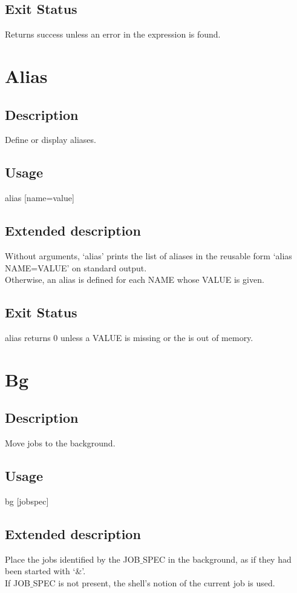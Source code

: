 \documentclass[12pt,a4paper]{report}
\begin{document}
\section{Exit Status}
Returns success unless an error in the expression is found.
\newpage

\chapter{Alias}
\section{Description}
Define or display aliases.
\section{Usage}
alias [name=value]
\section{Extended description}
Without arguments, `alias' prints the list of aliases in the reusable
form `alias NAME=VALUE' on standard output.\\

\noindent Otherwise, an alias is defined for each NAME whose VALUE is given.
\section{Exit Status}
alias returns 0 unless a VALUE is missing or the is out of memory.
\newpage
\chapter{Bg}
\section{Description}
Move jobs to the background.
\section{Usage}
bg [jobspec]
\section{Extended description}
Place the jobs identified by the JOB$\_$SPEC in the background, as if they had been started with `\&'. \\

\noindent If JOB$\_$SPEC is not present, the shell's notion of the current job is used.
\end{document}
